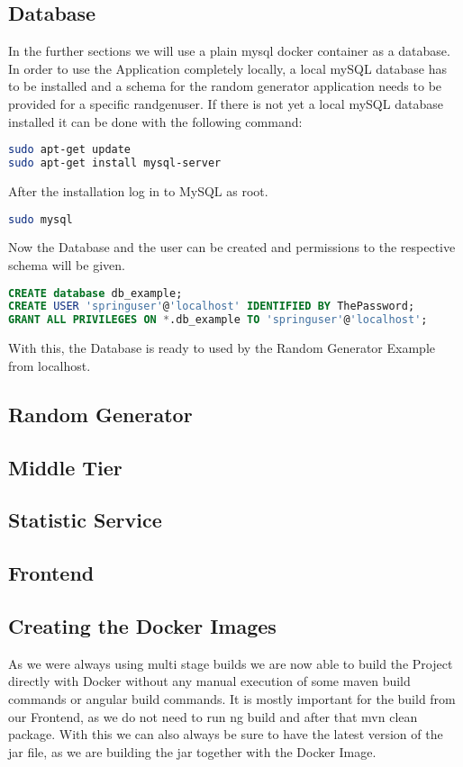 \subsection{Database}
In the further sections we will use a plain mysql docker container as a database. In order to use the Application completely locally, a local mySQL database has to be installed and a schema for the random generator application needs to be provided for a specific randgenuser.
If there is not yet a local mySQL database installed it can be done with the following command:
\begin{lstlisting}[language=Bash]
sudo apt-get update
sudo apt-get install mysql-server
\end{lstlisting}
After the installation log in to MySQL as root. 
\begin{lstlisting}[language=Bash]
sudo mysql
\end{lstlisting}
Now the Database and the user can be created and permissions to the respective schema will be given.
\begin{lstlisting}[language=SQL]
CREATE database db_example;
CREATE USER 'springuser'@'localhost' IDENTIFIED BY ThePassword;
GRANT ALL PRIVILEGES ON *.db_example TO 'springuser'@'localhost';
\end{lstlisting}
With this, the Database is ready to used by the Random Generator Example from localhost.

\subsection{Random Generator}



\subsection{Middle Tier}




\subsection{Statistic Service}


\subsection{Frontend}


\subsection{Creating the Docker Images}
As we were always using multi stage builds we are now able to build the Project directly with Docker without any manual execution of some maven build commands or angular build commands.
It is mostly important for the build from our Frontend, as we do not need to run ng build and after that mvn clean package.
With this we can also always be sure to have the latest version of the jar file, as we are building the jar together with the Docker Image.

